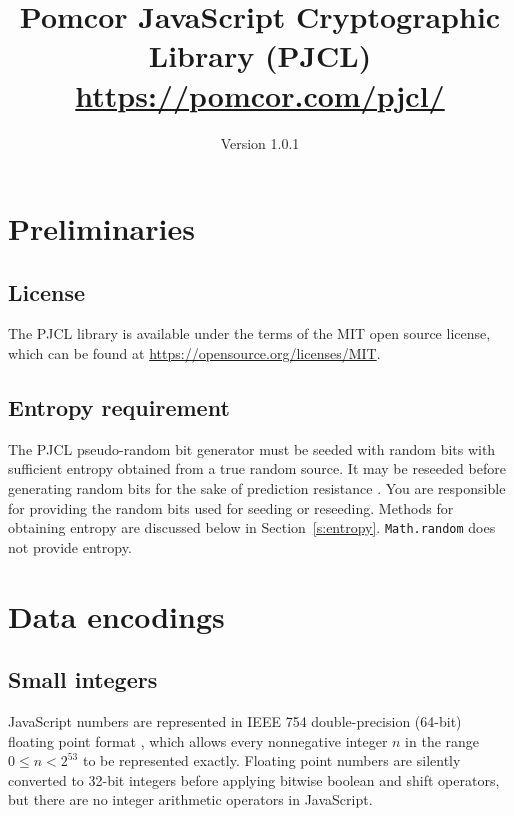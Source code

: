 \documentclass[12pt]{article}
\begin{document}
\title{Pomcor JavaScript Cryptographic Library (PJCL)\\\normalsize\url{https://pomcor.com/pjcl/}}
\author{Version 1.0.1}
\date{}
\maketitle



\tableofcontents
\listoftables

\section{Preliminaries}

\subsection{License}

The PJCL library is available under the terms of the MIT open source license,
which can be found at \url{https://opensource.org/licenses/MIT}.

\subsection{Entropy requirement}

The PJCL pseudo-random bit generator must be seeded with random bits
with sufficient entropy obtained from a true random source.  It may be
reseeded before generating random bits for the sake of prediction
resistance \cite[\S~8.8]{SP800-90Ar1}.  You are responsible for
providing the random bits used for seeding or reseeding.  Methods for
obtaining entropy are discussed below in Section~\ref{s:entropy}.
{\tt Math.random} does not provide entropy.

\section{Data encodings}
\label{s:encodings}

\subsection{Small integers}

JavaScript numbers are represented in IEEE 754
double-precision (64-bit) floating point format
\cite{IEEE-double-precision}, which allows every nonnegative integer
$n$ in the range $0 \leq n < 2^{53}$ to be represented exactly.  
Floating point numbers are silently converted to 32-bit integers 
before applying bitwise boolean and shift operators, but there
are no integer arithmetic operators in JavaScript.
\end{document}
